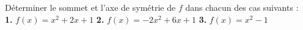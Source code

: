 \begin{Application}[][10 min]
Déterminer le sommet et l'axe de symétrie de $f$ dans chacun des cas suivants : \\
\textbf{1.} $f(x) = x^2 + 2x + 1$ \qquad 
\textbf{2.} $f(x) = -2x^2 + 6x + 1$ \qquad 
\textbf{3.} $f(x) = x^2 - 1$
\end{Application}

